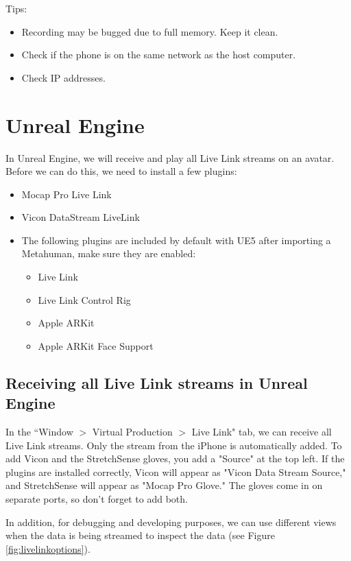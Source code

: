 \documentclass{uva-inf-article}
\begin{document}
Tips:
\begin{itemize}
    \item Recording may be bugged due to full memory. Keep it clean.
    \item Check if the phone is on the same network as the host computer.
    \item Check IP addresses.
\end{itemize}


\section{Unreal Engine}
In Unreal Engine, we will receive and play all Live Link streams on an avatar. Before we can do this, we need to install a few plugins:
\begin{itemize}
    \item Mocap Pro Live Link
    \item Vicon DataStream LiveLink
    \item The following plugins are included by default with UE5 after importing a Metahuman, make sure they are enabled:
    \begin{itemize}
        \item Live Link
        \item Live Link Control Rig
        \item Apple ARKit
        \item Apple ARKit Face Support
    \end{itemize}
\end{itemize}

\subsection{Receiving all Live Link streams in Unreal Engine}
In the ``Window $>$ Virtual Production $>$ Live Link" tab, we can receive all Live Link streams. Only the stream from the iPhone is automatically added. To add Vicon and the StretchSense gloves, you add a "Source" at the top left. If the plugins are installed correctly, Vicon will appear as "Vicon Data Stream Source," and StretchSense will appear as "Mocap Pro Glove." The gloves come in on separate ports, so don't forget to add both.

In addition, for debugging and developing purposes, we can use different views when the data is being streamed to inspect the data (see Figure \ref{fig:livelinkoptions}).
\end{document}
